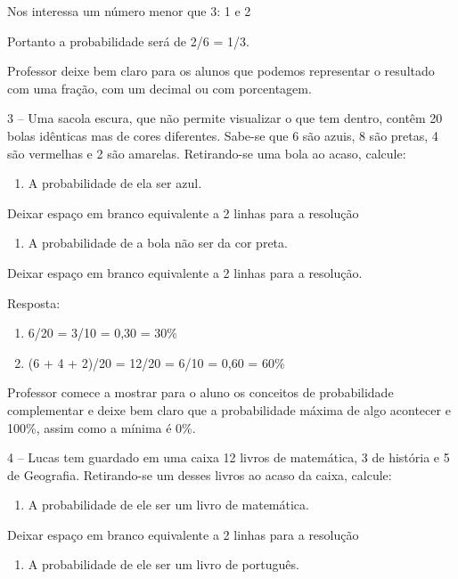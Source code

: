 Nos interessa um número menor que 3: 1 e 2

Portanto a probabilidade será de 2/6 = 1/3.

Professor deixe bem claro para os alunos que podemos representar o
resultado com uma fração, com um decimal ou com porcentagem.

3 -- Uma sacola escura, que não permite visualizar o que tem dentro,
contêm 20 bolas idênticas mas de cores diferentes. Sabe-se que 6 são
azuis, 8 são pretas, 4 são vermelhas e 2 são amarelas. Retirando-se uma
bola ao acaso, calcule:

\begin{enumerate}
\def\labelenumi{\alph{enumi})}
\item
  A probabilidade de ela ser azul.
\end{enumerate}

Deixar espaço em branco equivalente a 2 linhas para a resolução

\begin{enumerate}
\def\labelenumi{\alph{enumi})}
\item
  A probabilidade de a bola não ser da cor preta.
\end{enumerate}

Deixar espaço em branco equivalente a 2 linhas para a resolução.

Resposta:

\begin{enumerate}
\def\labelenumi{\alph{enumi})}
\item
  6/20 = 3/10 = 0,30 = 30\%
\item
  (6 + 4 + 2)/20 = 12/20 = 6/10 = 0,60 = 60\%
\end{enumerate}

Professor comece a mostrar para o aluno os conceitos de probabilidade
complementar e deixe bem claro que a probabilidade máxima de algo
acontecer e 100\%, assim como a mínima é 0\%.

4 -- Lucas tem guardado em uma caixa 12 livros de matemática, 3 de
história e 5 de Geografia. Retirando-se um desses livros ao acaso da
caixa, calcule:

\begin{enumerate}
\def\labelenumi{\alph{enumi})}
\item
  A probabilidade de ele ser um livro de matemática.
\end{enumerate}

Deixar espaço em branco equivalente a 2 linhas para a resolução

\begin{enumerate}
\def\labelenumi{\alph{enumi})}
\item
  A probabilidade de ele ser um livro de português.
\end{enumerate}


